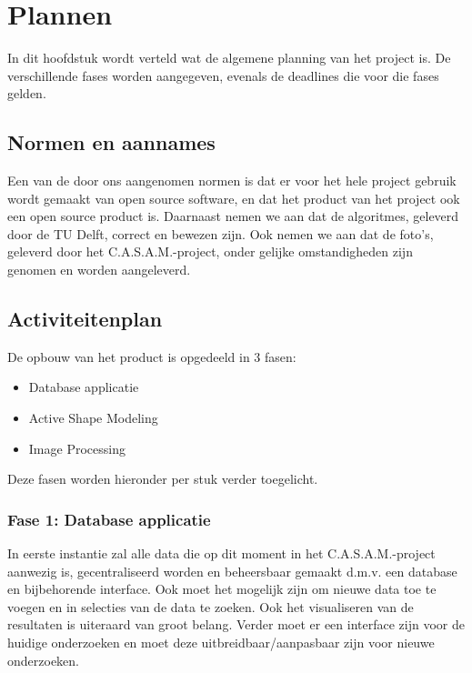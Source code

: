 \section{Plannen}
\label{plannen}

In dit hoofdstuk wordt verteld wat de algemene planning van het project is. 
De verschillende fases worden aangegeven, evenals de deadlines die voor die fases gelden.


\subsection{Normen en aannames}
Een van de door ons aangenomen normen is dat er voor het hele project gebruik wordt gemaakt van open source software, en dat het product van het project ook een open source product is. 
Daarnaast nemen we aan dat de algoritmes, geleverd door de TU Delft, correct en bewezen zijn.
Ook nemen we aan dat de foto's, geleverd door het C.A.S.A.M.-project, onder gelijke omstandigheden zijn genomen en worden aangeleverd.

\subsection{Activiteitenplan}
De opbouw van het product is opgedeeld in 3 fasen:
\begin{itemize}
	\item Database applicatie
	\item Active Shape Modeling
	\item Image Processing
\end{itemize}
Deze fasen worden hieronder per stuk verder toegelicht.

\subsubsection{Fase 1: Database applicatie}
In eerste instantie zal alle data die op dit moment in het C.A.S.A.M.-project aanwezig is, gecentraliseerd worden en beheersbaar gemaakt d.m.v. een database en bijbehorende interface. 
Ook moet het mogelijk zijn om nieuwe data toe te voegen en in selecties van de data te zoeken. 
Ook het visualiseren van de resultaten is uiteraard van groot belang. 
Verder moet er een interface zijn voor de huidige onderzoeken en moet deze uitbreidbaar/aanpasbaar zijn voor nieuwe onderzoeken.

